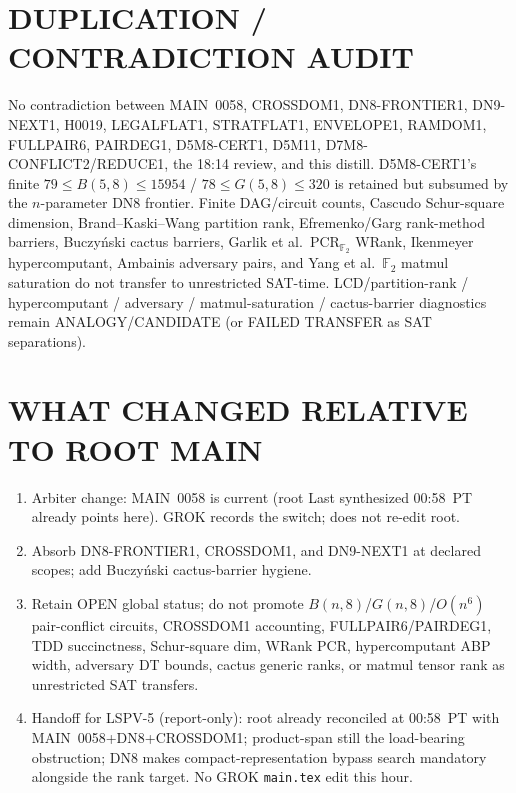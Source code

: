 \documentclass[11pt]{article}
\begin{document}
\section*{DUPLICATION / CONTRADICTION AUDIT}
No contradiction between MAIN~0058, CROSSDOM1, DN8-FRONTIER1, DN9-NEXT1,
H0019, LEGALFLAT1, STRATFLAT1, ENVELOPE1, RAMDOM1, FULLPAIR6, PAIRDEG1,
D5M8-CERT1, D5M11, D7M8-CONFLICT2/REDUCE1, the 18:14 review, and this distill.
D5M8-CERT1's finite $79\le B(5,8)\le 15954$ / $78\le G(5,8)\le 320$ is retained
but subsumed by the $n$-parameter DN8 frontier. Finite DAG/circuit counts,
Cascudo Schur-square dimension, Brand--Kaski--Wang partition rank,
Efremenko/Garg rank-method barriers, Buczy\'nski cactus barriers,
Garlik et al.\ PCR$_{\mathbb F_2}$ WRank, Ikenmeyer hypercomputant, Ambainis
adversary pairs, and Yang et al.\ $\mathbb F_2$ matmul saturation do not
transfer to unrestricted SAT-time. LCD/partition-rank / hypercomputant /
adversary / matmul-saturation / cactus-barrier diagnostics remain
ANALOGY/CANDIDATE (or FAILED TRANSFER as SAT separations).

\section*{WHAT CHANGED RELATIVE TO ROOT MAIN}
\begin{enumerate}
\item Arbiter change: MAIN~0058 is current (root Last synthesized 00:58~PT
already points here). GROK records the switch; does not re-edit root.
\item Absorb DN8-FRONTIER1, CROSSDOM1, and DN9-NEXT1 at declared scopes;
add Buczy\'nski cactus-barrier hygiene.
\item Retain OPEN global status; do not promote $B(n,8)$/$G(n,8)$/$O(n^6)$
pair-conflict circuits, CROSSDOM1 accounting, FULLPAIR6/PAIRDEG1,
TDD succinctness, Schur-square dim, WRank PCR, hypercomputant ABP width,
adversary DT bounds, cactus generic ranks, or matmul tensor rank as
unrestricted SAT transfers.
\item Handoff for LSPV-5 (report-only): root already reconciled at 00:58~PT with
MAIN~0058+DN8+CROSSDOM1; product-span still the load-bearing obstruction;
DN8 makes compact-representation bypass search mandatory alongside the
rank target. No GROK \texttt{main.tex} edit this hour.
\end{enumerate}
\end{document}
